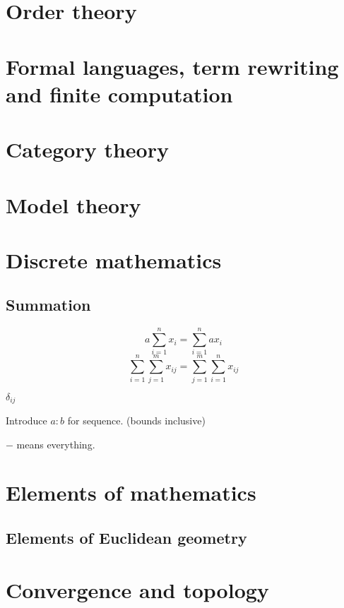 \documentclass{report}
\begin{document}
\part{Order theory}
\setcounter{chapter}{0} %


\part{Formal languages, term rewriting and finite computation}
\setcounter{chapter}{0} %


\part{Category theory}
\setcounter{chapter}{0} %


\part{Model theory}
\setcounter{chapter}{0} %


\part{Discrete mathematics}
\setcounter{chapter}{0} %
\chapter{Summation}
\[ a\sum_{i=1}^n x_i = \sum_{i=1}^n ax_i \]
\[ \sum_{i=1}^n\sum_{j=1}^m x_{ij} = \sum_{j=1}^m\sum_{i=1}^n x_{ij} \]

$\delta_{ij}$

Introduce $a:b$ for sequence. (bounds inclusive)

$-$ means everything.



\part{Elements of mathematics}
\setcounter{chapter}{0} %
\chapter{Elements of Euclidean geometry}


\part{Convergence and topology}
\setcounter{chapter}{0} %

\end{document}
